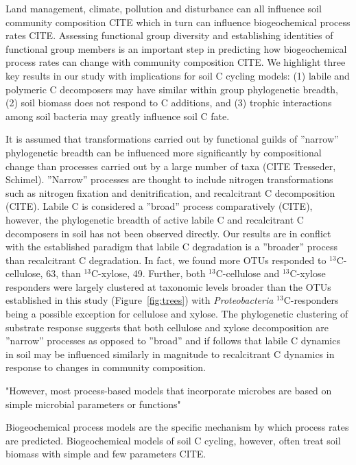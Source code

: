 Land management, climate, pollution and disturbance can all influence soil
community composition CITE which in turn can influence biogeochemical process
rates CITE. Assessing functional group diversity and establishing identities of
functional group members is an important step in predicting how biogeochemical
process rates can change with community composition CITE. We highlight three
key results in our study with implications for soil C cycling models: (1)
labile and polymeric C decomposers may have similar within group phylogenetic
breadth, (2) soil biomass does not respond  to C additions, and
(3) trophic interactions among soil bacteria may greatly influence soil C fate.

It is assumed that transformations carried out by functional guilds of
''narrow'' phylogenetic breadth can be influenced more significantly by
compositional change than processes carried out by a large number of taxa (CITE
Tresseder, Schimel). ''Narrow'' processes are thought to include nitrogen
transformations such as nitrogen fixation and denitrification, and recalcitrant
C decomposition (CITE). Labile C is considered a ''broad'' process
comparatively (CITE), however, the phylogenetic breadth of active labile C and
recalcitrant C decomposers in soil has not been observed directly. Our results
are in conflict with the established paradigm that labile C degradation is
a ''broader'' process than recalcitrant C degradation. In fact, we found more
OTUs responded to $^{13}$C-cellulose, 63, than $^{13}$C-xylose, 49. Further,
both $^{13}$C-cellulose and $^{13}$C-xylose responders were largely clustered
at taxonomic levels broader than the OTUs established in this study
(Figure~\ref{fig:trees}) with \textit{Proteobacteria} $^{13}$C-responders being
a possible exception for cellulose and xylose. The phylogenetic clustering of
substrate response suggests that both cellulose and xylose decomposition are
''narrow'' processes as opposed to ''broad'' and if follows that labile
C dynamics in soil may be influenced similarly in magnitude to recalcitrant
C dynamics in response to changes in community composition. 

"However, most process-based models that incorporate microbes are based on
simple microbial parameters or functions"

Biogeochemical process models are the specific mechanism by which process rates
are predicted. Biogeochemical models of soil C cycling, however, often treat
soil biomass with simple and few parameters CITE.  

